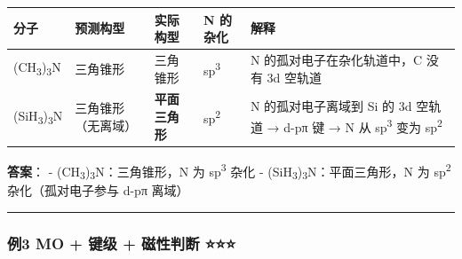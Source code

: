 \documentclass[a4paper,11pt]{ctexart}
\newcounter{none}
\begin{document}
{\def\LTcaptype{none} %
\begin{longtable}[]{@{}
  >{\raggedright\arraybackslash}p{}
  >{\raggedright\arraybackslash}p{}
  >{\raggedright\arraybackslash}p{}
  >{\centering\arraybackslash}p{}
  >{\raggedright\arraybackslash}p{}@{}}
\toprule\noalign{}
\begin{minipage}[b]{\linewidth}\raggedright
分子
\end{minipage} & \begin{minipage}[b]{\linewidth}\raggedright
预测构型
\end{minipage} & \begin{minipage}[b]{\linewidth}\raggedright
实际构型
\end{minipage} & \begin{minipage}[b]{\linewidth}\centering
N 的杂化
\end{minipage} & \begin{minipage}[b]{\linewidth}\raggedright
解释
\end{minipage} \\
\midrule\noalign{}
\endhead
\bottomrule\noalign{}
\endlastfoot
(CH\textsubscript{3})\textsubscript{3}N & 三角锥形 & 三角锥形 & sp\textsuperscript{3} & N 的孤对电子在杂化轨道中，C 没有 3d 空轨道 \\
(SiH\textsubscript{3})\textsubscript{3}N & 三角锥形（无离域） & \textbf{平面三角形} & sp\textsuperscript{2} & N 的孤对电子离域到 Si 的 3d 空轨道 → d-pπ 键 → N 从 sp\textsuperscript{3} 变为 sp\textsuperscript{2} \\
\end{longtable}
}

\textbf{答案}：
- (CH\textsubscript{3})\textsubscript{3}N：三角锥形，N 为 sp\textsuperscript{3} 杂化
- (SiH\textsubscript{3})\textsubscript{3}N：平面三角形，N 为 sp\textsuperscript{2} 杂化（孤对电子参与 d-pπ 离域）

\begin{center}\rule{0.5\linewidth}{0.5pt}\end{center}

\subsubsection{例3 MO + 键级 + 磁性判断 ⭐⭐⭐}\label{ux4f8b3-mo-ux952eux7ea7-ux78c1ux6027ux5224ux65ad}
\end{document}
